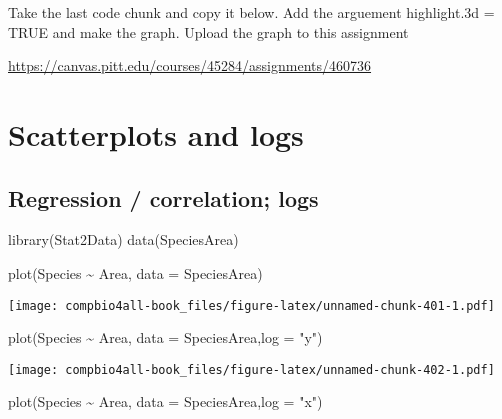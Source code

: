 \documentclass[
]{book}
\newenvironment{Shaded}{\begin{snugshade}}{\end{snugshade}}
\newcommand{\AttributeTok}[1]{\textcolor[rgb]{0.77,0.63,0.00}{#1}}
\newcommand{\FunctionTok}[1]{\textcolor[rgb]{0.00,0.00,0.00}{#1}}
\newcommand{\NormalTok}[1]{#1}
\newcommand{\SpecialCharTok}[1]{\textcolor[rgb]{0.00,0.00,0.00}{#1}}
\newcommand{\StringTok}[1]{\textcolor[rgb]{0.31,0.60,0.02}{#1}}
\begin{document}
Take the last code chunk and copy it below. Add the arguement
highlight.3d = TRUE
and make the graph. Upload the graph to this assignment

\url{https://canvas.pitt.edu/courses/45284/assignments/460736}

\hypertarget{scatterplots-and-logs}{%
\chapter{Scatterplots and logs}\label{scatterplots-and-logs}}

\hypertarget{regression-correlation-logs}{%
\section{Regression / correlation; logs}\label{regression-correlation-logs}}

\begin{Shaded}
\begin{Highlighting}[]
\FunctionTok{library}\NormalTok{(Stat2Data)}
\FunctionTok{data}\NormalTok{(SpeciesArea)}
\end{Highlighting}
\end{Shaded}

\begin{Shaded}
\begin{Highlighting}[]
\FunctionTok{plot}\NormalTok{(Species }\SpecialCharTok{\textasciitilde{}}\NormalTok{ Area, }\AttributeTok{data =}\NormalTok{ SpeciesArea)}
\end{Highlighting}
\end{Shaded}

\texttt{[image: compbio4all-book\_files/figure-latex/unnamed-chunk-401-1.pdf]}

\begin{Shaded}
\begin{Highlighting}[]
\FunctionTok{plot}\NormalTok{(Species }\SpecialCharTok{\textasciitilde{}}\NormalTok{ Area, }\AttributeTok{data =}\NormalTok{ SpeciesArea,}\AttributeTok{log =} \StringTok{"y"}\NormalTok{)}
\end{Highlighting}
\end{Shaded}

\texttt{[image: compbio4all-book\_files/figure-latex/unnamed-chunk-402-1.pdf]}

\begin{Shaded}
\begin{Highlighting}[]
\FunctionTok{plot}\NormalTok{(Species }\SpecialCharTok{\textasciitilde{}}\NormalTok{ Area, }\AttributeTok{data =}\NormalTok{ SpeciesArea,}\AttributeTok{log =} \StringTok{"x"}\NormalTok{)}
\end{Highlighting}
\end{Shaded}
\end{document}
